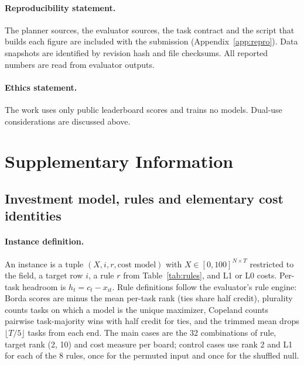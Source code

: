 \documentclass{article}
\begin{document}
\paragraph{Reproducibility statement.} The planner sources, the evaluator sources, the task contract and the script that builds each figure are included with the submission (Appendix~\ref{app:repro}). Data snapshots are identified by revision hash and file checksums. All reported numbers are read from evaluator outputs.

\paragraph{Ethics statement.} The work uses only public leaderboard scores and trains no models. Dual-use considerations are discussed above.

\clearpage



\clearpage
\appendix
\section{Supplementary Information}

\subsection{Investment model, rules and elementary cost identities}\label{app:model}
\paragraph{Instance definition.} An instance is a tuple $(X,i,r,\text{cost model})$ with $X\in[0,100]^{N\times T}$ restricted to the field, a target row $i$, a rule $r$ from Table~\ref{tab:rules}, and L1 or L0 costs. Per-task headroom is $h_t=c_t-x_{it}$. Rule definitions follow the evaluator's rule engine: Borda scores are minus the mean per-task rank (ties share half credit), plurality counts tasks on which a model is the unique maximizer, Copeland counts pairwise task-majority wins with half credit for ties, and the trimmed mean drops $\lfloor T/5\rfloor$ tasks from each end. The main cases are the 32 combinations of rule, target rank (2, 10) and cost measure per board; control cases use rank 2 and L1 for each of the 8 rules, once for the permuted input and once for the shuffled null.
\end{document}
